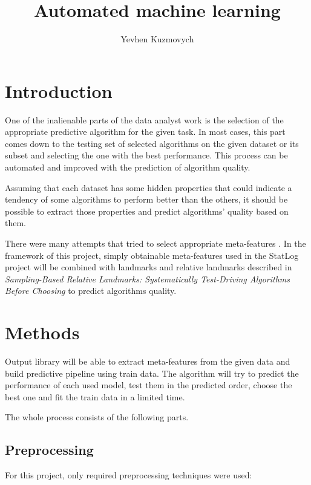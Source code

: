 \documentclass[hidelinks, english]{mvi-report}
\title{Automated machine learning}
\author{Yevhen Kuzmovych}
\affiliation{ČVUT - FIT}
\begin{document}
\maketitle

\section{Introduction}

One of the inalienable parts of the data analyst work is the selection of the appropriate predictive algorithm for
the given task. In most cases, this part comes down to the testing set of selected algorithms on the given dataset or its
subset and selecting the one with the best performance. This process can be automated and improved with the prediction of
algorithm quality.

Assuming that each dataset has some hidden properties that could indicate a tendency of some algorithms to perform
better than the others, it should be possible to extract those properties and predict algorithms' quality based on them.

There were many attempts that tried to select appropriate meta-features
\cite{sampling-based-relative-landmarks}\cite{statlog}\cite{meta-learning-for-algorithm-selection}. In the framework of
this project, simply obtainable meta-features used in the StatLog project\cite{statlog} will be combined with landmarks
and relative landmarks described in \textit{Sampling-Based Relative Landmarks: Systematically Test-Driving Algorithms
Before Choosing}\cite{sampling-based-relative-landmarks} to predict algorithms quality.

\section{Methods}

Output library will be able to extract meta-features from the given data and build predictive pipeline using train data.
The algorithm will try to predict the performance of each used model, test them in the predicted order, choose the best
one and fit the train data in a limited time.

The whole process consists of the following parts.

\subsection{Preprocessing}
For this project, only required preprocessing techniques were used:
\end{document}
